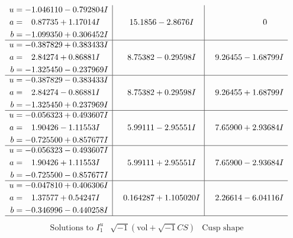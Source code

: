 \documentclass[1p]{elsarticle_modified}
\theoremstyle{definition}
\newcommand{\I}{\sqrt{-1}}
\begin{document}
$$\begin{array}{c|c|c}
\begin{aligned}
u &= -1.046110 - 0.792804 I \\
a &= \phantom{-}0.87735 + 1.17014 I \\
b &= -1.099350 + 0.306452 I\end{aligned}
 & \phantom{-}15.1856 - 2.8676 I & \phantom{-0.000000 } 0 \\ \hline\begin{aligned}
u &= -0.387829 + 0.383433 I \\
a &= \phantom{-}2.84274 + 0.86881 I \\
b &= -1.325450 - 0.237969 I\end{aligned}
 & \phantom{-}8.75382 - 0.29598 I & \phantom{-}9.26455 - 1.68799 I \\ \hline\begin{aligned}
u &= -0.387829 - 0.383433 I \\
a &= \phantom{-}2.84274 - 0.86881 I \\
b &= -1.325450 + 0.237969 I\end{aligned}
 & \phantom{-}8.75382 + 0.29598 I & \phantom{-}9.26455 + 1.68799 I \\ \hline\begin{aligned}
u &= -0.056323 + 0.493607 I \\
a &= \phantom{-}1.90426 - 1.11553 I \\
b &= -0.725500 + 0.857677 I\end{aligned}
 & \phantom{-}5.99111 - 2.95551 I & \phantom{-}7.65900 + 2.93684 I \\ \hline\begin{aligned}
u &= -0.056323 - 0.493607 I \\
a &= \phantom{-}1.90426 + 1.11553 I \\
b &= -0.725500 - 0.857677 I\end{aligned}
 & \phantom{-}5.99111 + 2.95551 I & \phantom{-}7.65900 - 2.93684 I \\ \hline\begin{aligned}
u &= -0.047810 + 0.406306 I \\
a &= \phantom{-}1.37577 + 0.54247 I \\
b &= -0.346996 - 0.440258 I\end{aligned}
 & \phantom{-}0.164287 + 1.105020 I & \phantom{-}2.26614 - 6.04116 I\\
 \hline 
 \end{array}$$\newpage$$\begin{array}{c|c|c}  
\text{Solutions to }I^u_{1}& \I (\text{vol} + \sqrt{-1}CS) & \text{Cusp shape}\\

\end{array}$$
\end{document}
